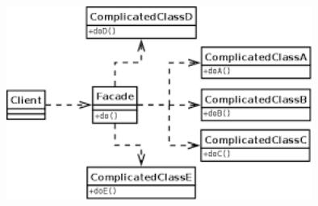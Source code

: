 \begin{flushleft}
\begin{itemize}
	
	\begin{center}
	\includegraphics[width=10cm]{./images/2} 
	\end{center}

	

\end{itemize} 


\end{flushleft}